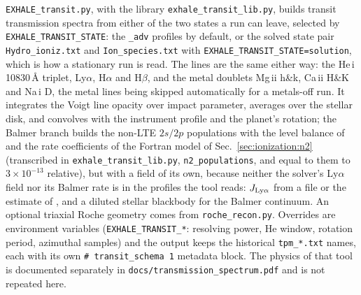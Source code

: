 \texttt{EXHALE\_transit.py}, with the library
\texttt{exhale\_transit\_lib.py}, builds transit transmission spectra from
either of the two states a run can leave, selected by
\texttt{EXHALE\_TRANSIT\_STATE}: the \texttt{\_adv} profiles by default,
or the solved state pair \texttt{Hydro\_ioniz.txt} and
\texttt{Ion\_species.txt} with \texttt{EXHALE\_TRANSIT\_STATE=solution},
which is how a stationary run is read.  The lines are the same either way:
the He\,{\sc i} 10830\,\AA{} triplet,
Ly$\alpha$, H$\alpha$ and H$\beta$, and the metal doublets Mg\,{\sc ii}
h\&k, Ca\,{\sc ii} H\&K and Na\,{\sc i} D, the metal lines being skipped
automatically for a metals-off run. It integrates the Voigt line opacity
over impact parameter, averages over the stellar disk, and convolves with
the instrument profile and the planet's rotation; the Balmer branch builds
the non-LTE $2s/2p$ populations with the level balance of
\citet{Christie2013} and the rate coefficients of the Fortran model of
Sec.~\ref{sec:ionization:n2} (transcribed in \texttt{exhale\_transit\_lib.py},
\texttt{n2\_populations}, and equal to them to $3\times10^{-13}$ relative), but with a field
of its own, because neither the solver's Ly$\alpha$ field nor its Balmer
rate is in the profiles the tool reads: $J_{\rm Ly\alpha}$ from a file or
the estimate of \citet{Huang2017}, and a diluted stellar blackbody for
the Balmer continuum. An
optional triaxial Roche geometry comes from \texttt{roche\_recon.py}.
Overrides are environment variables (\texttt{EXHALE\_TRANSIT\_*}: resolving
power, He window, rotation period, azimuthal samples) and the output keeps
the historical \texttt{tpm\_*.txt} names, each with its own
\texttt{\# transit\_schema 1} metadata block. The physics of that tool is
documented separately in \texttt{docs/transmission\_spectrum.pdf} and is not
repeated here.

